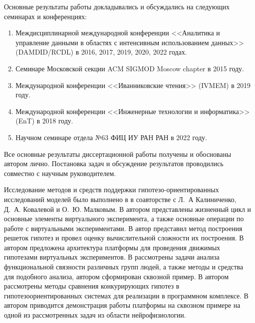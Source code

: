 {\probation}
Основные результаты работы докладывались и обсуждались на следующих семинарах и конференциях:
\begin{enumerate}
    \item Междисциплинарной международной конференции <<Аналитика и управление данными в областях с интенсивным 
    использованием данных>> (DAMDID/RCDL) в 2016, 2017, 2019, 2020, 2022 годах.
    \item Семинаре Московской секции ACM SIGMOD Moscow chapter в 2015 году.
    \item Международной конференции <<Иванниковские чтения>> (IVMEM) в 2019 году.
    \item Международной конференции <<Инженерные технологии и информатика>> (EnT) в 2018 году.	
    \item Научном семинаре отдела №63 ФИЦ ИУ РАН РАН в 2022 году.

\end{enumerate}

{\contribution} 

Все основные результаты диссертационной работы получены и обоснованы автором лично. 
Постановка задач и обсуждение результатов проводились совместно с научным руководителем. 

Исследование методов и средств поддержки гипотезо-ориентированных исследований моделей было выполнено в
\cite{kalinichenko2015methods} в соавторстве с Л.~А Калиниченко, Д.~А. Ковалевой и О.~Ю. Малковым.
В \cite{kovalev2017organization, kovalev2019virtual} автором представлены жизненный цикл и основные элементы 
виртуального эксперимента, а также основные операции по работе с виртуальными экспериментами. 
В \cite{kovalev2019constructing} автор представил метод построения решеток гипотез и провел оценку вычислительной сложности 
их построения. 
В \cite{kovalev2020architecture} автором предложена архитектура платформы для проведения движимых гипотезами 
виртуальных экспериментов. 
В \cite{kovalev2017search, kovalev2020multidisciplinary, kovalev2020methods} рассмотрены задачи анализа 
функциональной связности различных групп людей, а также методы и средства для подобного анализа, автором сформирован 
сквозной пример. 
В \cite{tirikov2021methods} автором рассмотрены методы сравнения конкурирующих гипотез 
в гипотезоориентированных системах для реализации в программном комплексе.
В \cite{} автором приводится демонстрация работы платформы на сквозном примере на одной из рассмотренных задач из 
области нейрофизиологии.


